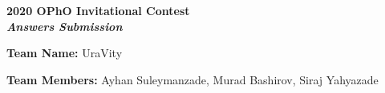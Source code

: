 \documentclass{article}
\begin{document}
\begin{titlepage}
    \begin{center}
        \vspace*{1cm}
 
        \Huge
        \textbf{2020 OPhO Invitational Contest \\ \textit{Answers Submission}} 
        
        \Large
        \vspace{0.5cm}
        \textbf{Team Name:} UraVity
        
        \Large
        \vspace{0.5cm}
        \textbf{Team Members:} Ayhan Suleymanzade, Murad Bashirov, Siraj Yahyazade
    \end{center}
\end{titlepage}





\newpage






\end{document}
